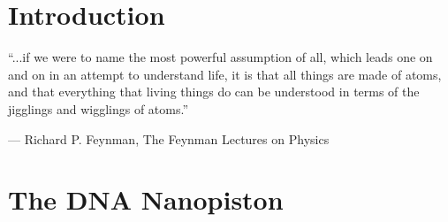\documentclass[11pt,a4paper,twoside]{vutinfth}
\begin{document}

\newcommand\mycommfont[1]{\small\ttfamily\textcolor{blue}{#1}}

\frontmatter
\rmfamily

 \cleardoublepage
 \cleardoublepage
\setcounter{page}{0}

\cleardoublepage
 \cleardoublepage
\printglossaries \cleardoublepage
\listoffigures \cleardoublepage
\listoftables \cleardoublepage
\linespread{0.816}
{\small \tableofcontents}
\cleardoublepage
\linespread{1}

\mainmatter
\setcounter{page}{0}

\chapter{Introduction}
\vspace{-1cm}
\epigraphfontsize{\small\itshape}
\epigraph{“...if we were to name the most powerful assumption of all, which leads one on
and on in an attempt to understand life, it is that all things are made of atoms, and
that everything that living things do can be understood in terms of the jigglings and
wigglings of atoms.”}
{--- \textup{Richard P. Feynman}, The Feynman Lectures on Physics\cite{feynmanLectures}}






\cleardoublepage
\chapter{The DNA Nanopiston}



\end{document}
